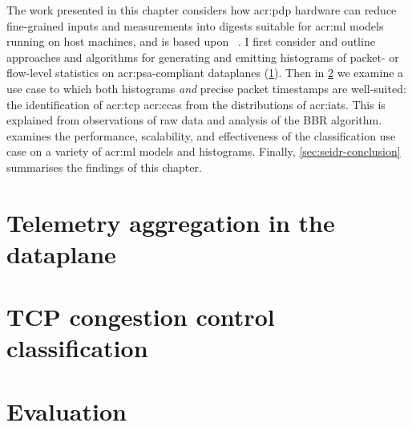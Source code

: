 The work presented in this chapter considers how \gls{acr:pdp} hardware can reduce fine-grained inputs and measurements into digests suitable for \gls{acr:ml} models running on host machines, and is based upon ~\parencite{DBLP:conf/globecom/SimpsonCP20}.
I first consider and outline approaches and algorithms for generating and emitting histograms of packet- or flow-level statistics on \gls{acr:psa}-compliant dataplanes (\cref{sec:seidr-architecture}).
Then in \cref{sec:seidr-tcpcc} we examine a use case to which both histograms \emph{and} precise packet timestamps are well-suited: the identification of \gls{acr:tcp} \glspl{acr:cca} from the distributions of \glspl{acr:iat}.
This is explained from observations of raw data and analysis of the BBR algorithm.
 examines the performance, scalability, and effectiveness of the classification use case on a variety of \gls{acr:ml} models and \seidr{} histograms.
Finally, \cref{sec:seidr-conclusion} summarises the findings of this chapter.

%

\section{Telemetry aggregation in the dataplane}\label{sec:seidr-architecture}


\section{TCP congestion control classification}\label{sec:seidr-tcpcc}


\section{Evaluation}\label{sec:seidr-evaluation}


% 

